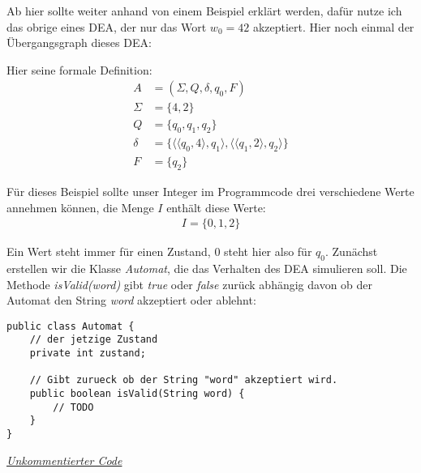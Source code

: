 \begin{flushleft}
Ab hier sollte weiter anhand von einem Beispiel erklärt werden,
dafür nutze ich das obrige  eines DEA,
der nur das Wort $w_0=42$ akzeptiert.
Hier noch einmal der Übergangsgraph dieses DEA:
\end{flushleft}

\begin{center}
\end{center}

\begin{flushleft}
Hier seine formale Definition:
\begin{align}
    A &= (\Sigma,Q,\delta,q_0,F) \\
    \Sigma &= \{4,2\} \\
    Q &= \{q_0,q_1,q_2\} \\
    \delta &= \{\langle \langle q_0, 4 \rangle, q_1 \rangle, \langle \langle q_1, 2 \rangle, q_2 \rangle \} \\
    F &= \{q_2\}
\end{align}

Für dieses Beispiel sollte unser Integer im Programmcode
drei verschiedene Werte annehmen können,
die Menge $I$ enthält diese Werte:
\begin{align}
    I=\{0,1,2\}
\end{align}

Ein Wert steht immer für einen Zustand, $0$ steht hier also für $q_0$.
Zunächst erstellen wir die Klasse \textit{Automat},
die das Verhalten des DEA simulieren soll.
Die Methode \textit{isValid(word)} gibt \textit{true}
oder \textit{false} zurück abhängig davon ob der Automat den String
\textit{word} akzeptiert oder ablehnt:
\end{flushleft}

\begin{center}  
\begin{lstlisting}
public class Automat {
    // der jetzige Zustand
    private int zustand;

    // Gibt zurueck ob der String "word" akzeptiert wird.
    public boolean isValid(String word) {
        // TODO
    }
}
\end{lstlisting}
\href{https://raw.githubusercontent.com/tim-tm/articles/refs/heads/main/informatik-notes/code/Automat.java}{\textit{Unkommentierter Code}} \\
\end{center}

